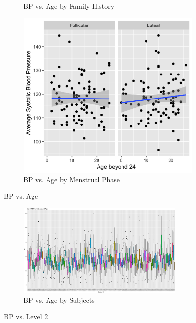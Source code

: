 \documentclass[12pt,twoside,letterpaper]{article}
\theoremstyle{definition}
\theoremstyle{definition}
\begin{document}
\begin{appendices}
\begin{figure}[h]
\begin{subfigure}[b]{0.3\textwidth}
        \caption[]%
        {{\small BP vs. Age by Family History}}
        \label{fig: bp v age and fh}
        \end{subfigure}
        \hfill
        \begin{subfigure}[b]{0.3\textwidth}
        \centering
        \includegraphics[width=\textwidth]{pics/bp by age and phase.png}
        \caption[]%
        {{\small BP vs. Age by Menstrual Phase}}
        \label{fig: bp v age and phase}
        \end{subfigure}
        \caption[]
        {\small BP vs. Age}
        \label{fig: bp v age and lv 2}
        \end{figure}

    \begin{figure}[h] 
        \centering
        \begin{subfigure}[b]{\textwidth}
            \centering
            \includegraphics[width=0.9\textwidth]{pics/bp by id and age.png}
            \caption{BP vs. Age by Subjects}
            \label{fig: bp v id and age}
        \end{subfigure}
        \caption{BP vs. Level 2}
        \label{fig: bp v id and level2_1}
    \end{figure}


\end{appendices}
\end{document}
